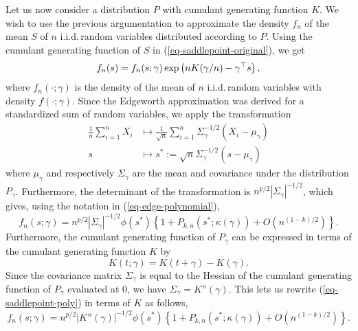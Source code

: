 Let us now consider a distribution $P$ with cumulant generating function $K$. We wish to use the previous argumentation to approximate the density $f_n$ of the mean $S$ of $n$ i.i.d.\,random variables distributed according to $P$. Using the cumulant generating function of $S$ in (\ref{eq-saddlepoint-original}), we get
\begin{equation} \label{eq-fn-in-terms-of-fngamma}
    f_n(s) = f_n(s; \gamma)\exp\left(nK(\gamma / n) - \gamma^\top s\right),
\end{equation}
where $f_n(\cdot; \gamma)$ is the density of the mean of $n$ i.i.d.\,random variables with density $f(\cdot; \gamma)$. Since the Edgeworth approximation was derived for a standardized sum of random variables, we apply the transformation
\begin{align*}
    \frac{1}{n}\sum_{i=1}^n X_i &\mapsto \frac{1}{\sqrt{n}}\sum_{i=1}^n \Sigma_\gamma^{-1/2}(X_i - \mu_\gamma)\\
    s &\mapsto s^* := \sqrt{n}\Sigma_\gamma^{-1/2}(s - \mu_\gamma)
\end{align*}
where $\mu_\gamma$ and respectively $\Sigma_\gamma$ are the mean and covariance under the distribution $P_\gamma$. Furthermore, the determinant of the transformation is $n^{p/2}|\Sigma_\gamma|^{-1/2}$, which gives, using the notation in (\ref{eq-edge-polynomial}),
\begin{equation} \label{eq-saddlepoint-poly}
    f_n(s; \gamma) = n^{p/2}|\Sigma_\gamma|^{-1/2} \phi(s^*)\left\{ 1 + P_{k, n}(s^*; \kappa(\gamma)) + O(n^{(1-k)/2})\right\}.
\end{equation}
Furthermore, the cumulant generating function of $P_\gamma$ can be expressed in terms of the cumulant generating function $K$ by
\begin{equation*}
    K(t; \gamma) = K(t + \gamma) - K(\gamma).
\end{equation*}
Since the covariance matrix $\Sigma_\gamma$ is equal to the Hessian of the cumulant generating function of $P_\gamma$ evaluated at 0, we have $\Sigma_\gamma = K''(\gamma)$. This lets us rewrite (\ref{eq-saddlepoint-poly}) in terms of $K$ as follows,
\begin{equation*}
    f_n(s; \gamma) = n^{p/2}|K''(\gamma)|^{-1/2} \phi(s^*)\left\{ 1 + P_{k, n}(s^*; \kappa(\gamma)) + O(n^{(1-k)/2})\right\}.
\end{equation*}

